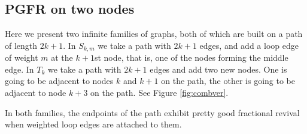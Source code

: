 \documentclass[11pt]{article}
\theoremstyle{definition}
\numberwithin{equation}{section}
\newcommand\+{\mkern2mu}
\newcommand{\1}{\mathbf 1}
\begin{document}
\subsection{PGFR on two nodes}

Here we present two infinite families of graphs, both of which are built on a path of length $2k+1$. In $S_{k,m}$ we take a path with $2k+1$ edges, and add a loop edge of weight $m$ at the $k+1$st node, that is, one of the nodes forming the middle edge. In $T_k$ we take a path with $2k+1$ edges and add two new nodes. One is going to be adjacent to nodes $k$ and $k+1$ on the path, the other is going to be adjacent to node $k+3$ on the path. See Figure \ref{fig:combver}.

In both families, the endpoints of the path exhibit pretty good fractional revival when weighted loop edges are attached to them.
\end{document}
